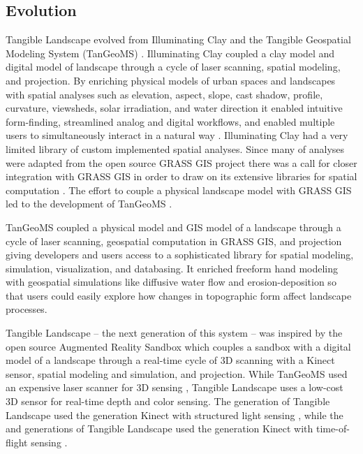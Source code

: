\documentclass[prodmode,acmtochi]{acmsmall} %
\begin{document}
\subsection{Evolution}
Tangible Landscape evolved from 
Illuminating Clay \cite{Piper2002a} and 
the Tangible Geospatial Modeling System (TanGeoMS) \cite{Tateosian2010}. 
Illuminating Clay coupled a clay model and digital model of landscape 
through a cycle of laser scanning, spatial modeling, and projection.
By enriching physical models of urban spaces and landscapes 
with spatial analyses  
such as 
elevation, aspect, slope, cast shadow, profile, curvature, 
viewsheds, solar irradiation, and water direction
it enabled
intuitive form-finding, 
streamlined analog and digital workflows, 
and enabled multiple users to simultaneously interact in a natural way \cite{Ratti2004}. 
Illuminating Clay had a very limited library of custom implemented spatial analyses. 
Since many of analyses were adapted 
from the open source GRASS GIS project \cite{Piper2002a} 
there was a call for closer integration with GRASS GIS 
in order to draw on its extensive libraries 
for spatial computation \cite{Piper2002b}. 
The effort to couple a physical landscape model with GRASS GIS \cite{Mitasova2006} 
led to the development of 
TanGeoMS \cite{Tateosian2010}.

TanGeoMS coupled a physical model and GIS model of a landscape 
through a cycle of laser scanning, 
geospatial computation in GRASS GIS, and projection
giving developers and users access to 
a sophisticated library for 
spatial modeling, simulation, visualization, and databasing.
It enriched freeform hand modeling with geospatial simulations 
like diffusive water flow and erosion-deposition 
so that users could easily explore how 
changes in topographic form affect landscape processes. 

Tangible Landscape -- the next generation of this system -- was inspired by
the open source Augmented Reality Sandbox \cite{Kreylos2012}
which couples a sandbox with a digital model of a landscape 
through a real-time cycle of 3D scanning with a Kinect sensor, spatial modeling and simulation, and projection.
While TanGeoMS used an expensive laser scanner
for 3D sensing \cite{Tateosian2010}, 
Tangible Landscape uses a low-cost 3D sensor %
for real-time depth and color sensing. 
The  generation of Tangible Landscape \cite{Petrasova2014} 
used the  generation Kinect with structured light sensing \cite{Smisek2011}, 
while the   \cite{Petrasova2015} and  generations of Tangible Landscape 
used the  generation Kinect with time-of-flight sensing \cite{Bamji2015}. 
\end{document}

